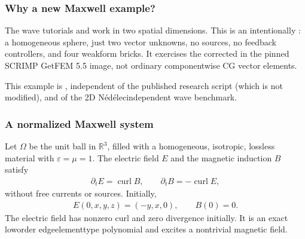 \documentclass[letterpaper,10pt,english]{sphinxmanual}
\begin{document}
\subsubsection{Why a new Maxwell example?}
\label{\detokenize{examples/maxwell_3d:why-a-new-maxwell-example}}\label{\detokenize{examples/maxwell_3d:maxwell-3d}}
\sphinxAtStartPar
The wave tutorials {\hyperref[\detokenize{examples/wave::doc}]{}} and {\hyperref[\detokenize{examples/wave_coenergy::doc}]{}} work
in two spatial dimensions. This is an intentionally : a homogeneous sphere, just two vector
unknowns, no sources, no feedback controllers, and four
weak\sphinxhyphen{}form bricks. It exercises the corrected  in the pinned SCRIMP GetFEM 5.5
image, not ordinary componentwise CG vector elements.

\sphinxAtStartPar
This example is , independent of the published
 research script (which is
not modified), and of the 2D Nédélec\sphinxhyphen{}independent
wave benchmark.


\subsubsection{A normalized Maxwell system}
\label{\detokenize{examples/maxwell_3d:a-normalized-maxwell-system}}
\sphinxAtStartPar
Let \(\Omega\) be the unit ball in
\(\mathbb R^3\), filled with a homogeneous,
isotropic, lossless material with 
\(\varepsilon=\mu=1\). The electric field
\(E\) and the magnetic induction \(B\) satisfy
\begin{equation*}
\begin{split}\partial_t E = \operatorname{curl} B,\qquad
\partial_t B = -\operatorname{curl} E,\end{split}
\end{equation*}
\sphinxAtStartPar
without free currents or sources. Initially,
\begin{equation*}
\begin{split}E(0,x,y,z)=(-y,x,0),\qquad B(0)=0.\end{split}
\end{equation*}
\sphinxAtStartPar
The electric field has nonzero curl and
zero divergence initially. It is an exact
low\sphinxhyphen{}order edge\sphinxhyphen{}element\sphinxhyphen{}type polynomial and
excites a nontrivial magnetic field.
\end{document}
